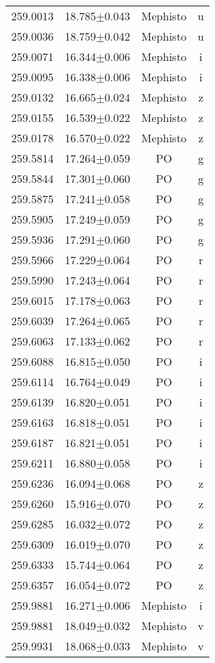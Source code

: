 \begin{table}
\begin{tabular}{cccc}
259.0013 & 18.785$\pm$0.043 & Mephisto & u \\
259.0036 & 18.759$\pm$0.042 & Mephisto & u \\
259.0071 & 16.344$\pm$0.006 & Mephisto & i \\
259.0095 & 16.338$\pm$0.006 & Mephisto & i \\
259.0132 & 16.665$\pm$0.024 & Mephisto & z \\
259.0155 & 16.539$\pm$0.022 & Mephisto & z \\
259.0178 & 16.570$\pm$0.022 & Mephisto & z \\
259.5814 & 17.264$\pm$0.059 & PO & g \\
259.5844 & 17.301$\pm$0.060 & PO & g \\
259.5875 & 17.241$\pm$0.058 & PO & g \\
259.5905 & 17.249$\pm$0.059 & PO & g \\
259.5936 & 17.291$\pm$0.060 & PO & g \\
259.5966 & 17.229$\pm$0.064 & PO & r \\
259.5990 & 17.243$\pm$0.064 & PO & r \\
259.6015 & 17.178$\pm$0.063 & PO & r \\
259.6039 & 17.264$\pm$0.065 & PO & r \\
259.6063 & 17.133$\pm$0.062 & PO & r \\
259.6088 & 16.815$\pm$0.050 & PO & i \\
259.6114 & 16.764$\pm$0.049 & PO & i \\
259.6139 & 16.820$\pm$0.051 & PO & i \\
259.6163 & 16.818$\pm$0.051 & PO & i \\
259.6187 & 16.821$\pm$0.051 & PO & i \\
259.6211 & 16.880$\pm$0.058 & PO & i \\
259.6236 & 16.094$\pm$0.068 & PO & z \\
259.6260 & 15.916$\pm$0.070 & PO & z \\
259.6285 & 16.032$\pm$0.072 & PO & z \\
259.6309 & 16.019$\pm$0.070 & PO & z \\
259.6333 & 15.744$\pm$0.064 & PO & z \\
259.6357 & 16.054$\pm$0.072 & PO & z \\
259.9881 & 16.271$\pm$0.006 & Mephisto & i \\
259.9881 & 18.049$\pm$0.032 & Mephisto & v \\
259.9931 & 18.068$\pm$0.033 & Mephisto & v \\

\end{tabular}
\end{table}

